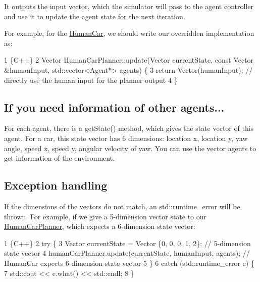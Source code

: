 It outputs the input vector, which the simulator will pass to the agent controller and use it to update the agent state for the next iteration.

For example, for the \hyperlink{classHumanCar}{Human\+Car}, we should write our overridden implementation as\+: 
\begin{DoxyCode}
1 \{C++\}
2 Vector HumanCarPlanner::update(Vector currentState, const Vector &humanInput, std::vector<Agent*> agents) \{
3     return Vector(humanInput); // directly use the human input for the planner output
4 \}
\end{DoxyCode}


\subsection*{If you need information of other agents...}

For each agent, there is a {\ttfamily get\+State()} method, which gives the state vector of this agent. For a car, this state vector has 6 dimensions\+: location x, location y, yaw angle, speed x, speed y, angular velocity of yaw. You can use the vector {\ttfamily agents} to get information of the environment.

\subsection*{Exception handling}

If the dimensions of the vectors do not match, an {\ttfamily std\+::runtime\+\_\+error} will be thrown. For example, if we give a 5-\/dimension vector {\ttfamily state} to our {\ttfamily \hyperlink{classHumanCarPlanner}{Human\+Car\+Planner}}, which expects a 6-\/dimension state vector\+: 
\begin{DoxyCode}
1 \{C++\}
2 try \{
3     Vector currentState = Vector \{0, 0, 0, 1, 2\}; // 5-dimension state vector
4     humanCarPlanner.update(currentState, humanInput, agents); // HumanCar expects 6-dimension state vector
5 \}
6 catch (std::runtime\_error e) \{
7     std::cout << e.what() << std::endl;
8 \}
\end{DoxyCode}
 